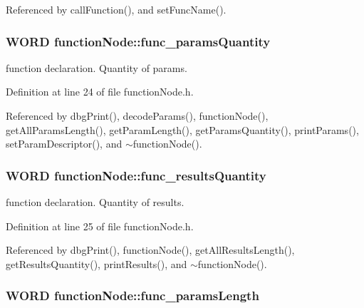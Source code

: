 Referenced by callFunction(), and setFuncName().

\hypertarget{classfunctionNode_a461172016ad26ecc31ef69903404cdf4}{
\subsubsection[{func\_\-paramsQuantity}]{\setlength{\rightskip}{0pt plus 5cm}WORD {\bf functionNode::func\_\-paramsQuantity}}}
\label{d1/d20/classfunctionNode_a461172016ad26ecc31ef69903404cdf4}


function declaration. Quantity of params. 



Definition at line 24 of file functionNode.h.



Referenced by dbgPrint(), decodeParams(), functionNode(), getAllParamsLength(), getParamLength(), getParamsQuantity(), printParams(), setParamDescriptor(), and $\sim$functionNode().

\hypertarget{classfunctionNode_aef26d02725489ecb8e6cfe169736e395}{
\subsubsection[{func\_\-resultsQuantity}]{\setlength{\rightskip}{0pt plus 5cm}WORD {\bf functionNode::func\_\-resultsQuantity}}}
\label{d1/d20/classfunctionNode_aef26d02725489ecb8e6cfe169736e395}


function declaration. Quantity of results. 



Definition at line 25 of file functionNode.h.



Referenced by dbgPrint(), functionNode(), getAllResultsLength(), getResultsQuantity(), printResults(), and $\sim$functionNode().

\hypertarget{classfunctionNode_ace4690387e94d2d3bdeecf810af9f394}{
\subsubsection[{func\_\-paramsLength}]{\setlength{\rightskip}{0pt plus 5cm}WORD {\bf functionNode::func\_\-paramsLength}}}
\label{d1/d20/classfunctionNode_ace4690387e94d2d3bdeecf810af9f394}


